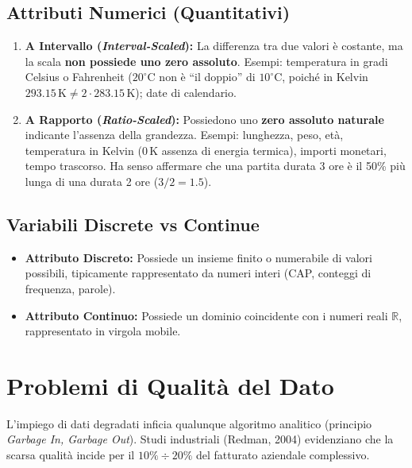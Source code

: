 \subsection{Attributi Numerici (Quantitativi)}
\begin{enumerate}
    \item \textbf{A Intervallo (\textit{Interval-Scaled}):} La differenza tra due valori \`e costante, ma la scala \textbf{non possiede uno zero assoluto}. Esempi: temperatura in gradi Celsius o Fahrenheit ($20^\circ\text{C}$ non \`e ``il doppio'' di $10^\circ\text{C}$, poich\'e in Kelvin $293.15\,\text{K} \neq 2 \cdot 283.15\,\text{K}$); date di calendario.
    \item \textbf{A Rapporto (\textit{Ratio-Scaled}):} Possiedono uno \textbf{zero assoluto naturale} indicante l'assenza della grandezza. Esempi: lunghezza, peso, et\`a, temperatura in Kelvin ($0\,\text{K}$ assenza di energia termica), importi monetari, tempo trascorso. Ha senso affermare che una partita durata 3 ore \`e il 50\% pi\`u lunga di una durata 2 ore ($3/2 = 1.5$).
\end{enumerate}

\subsection{Variabili Discrete vs Continue}
\begin{itemize}
    \item \textbf{Attributo Discreto:} Possiede un insieme finito o numerabile di valori possibili, tipicamente rappresentato da numeri interi (CAP, conteggi di frequenza, parole).
    \item \textbf{Attributo Continuo:} Possiede un dominio coincidente con i numeri reali $\mathbb{R}$, rappresentato in virgola mobile.
\end{itemize}

\FloatBarrier
\section{Problemi di Qualit\`a del Dato}

L'impiego di dati degradati inficia qualunque algoritmo analitico (principio \textit{Garbage In, Garbage Out}). Studi industriali (Redman, 2004) evidenziano che la scarsa qualit\`a incide per il $10\%\div 20\%$ del fatturato aziendale complessivo.

